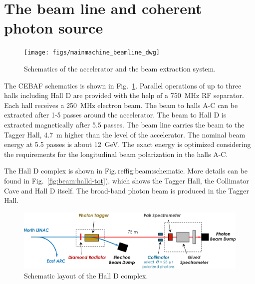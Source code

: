 
\section[The beam line and coherent photon source (TCR/Stuart)]{The beam line and coherent photon source \label{sec:beamline}}

\begin{figure}[t]
\begin{center}
   \texttt{[image: figs/mainmachine\_beamline\_dwg]}
\end{center}
\caption{Schematics of the accelerator and the beam extraction system.
        }
\label{fig:beam:cebaf-dwg} 
\end{figure}

The CEBAF schematics is shown in Fig.~\ref{fig:beam:cebaf-dwg}.
Parallel operations of up to three halls including Hall D are provided
with the help of a 750~MHz RF separator. Each hall receives a 250~MHz
electron beam. The beam to halls A-C can be extracted after 1-5 passes
around the accelerator. The beam to Hall D is extracted magnetically
after 5.5 passes. The beam line carries the beam to the Tagger Hall,
4.7~m higher than the level of the accelerator.  The nominal beam
energy at 5.5 passes is about 12~GeV. The exact energy is optimized
considering the requirements for the longitudinal beam polarization in
the halls A-C.

The Hall D complex is shown in Fig.\,ref{fig:beam:schematic}. More details can be found in Fig.~\ref{fig:beam:halld-tot}), which shows the Tagger
Hall, the Collimator Cave and Hall D itself. The broad-band photon
beam is produced in the Tagger Hall.

\begin{figure}[t]
\begin{center}
   \includegraphics[clip=true,width=0.98\linewidth]{figures/gx_beamline_0}
\end{center}
\caption{Schematic layout of the Hall D complex.
        }
\label{fig:beam:schematic} 
\end{figure}

